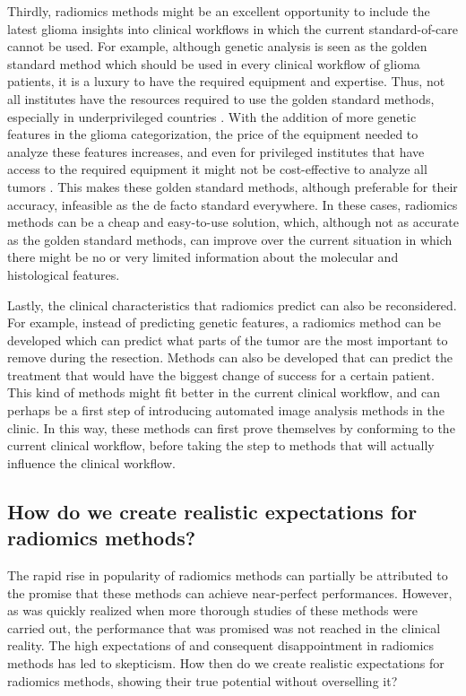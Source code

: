 Thirdly, radiomics methods might be an excellent opportunity to include  the latest glioma insights into clinical workflows in which the current standard-of-care cannot be used.
For example, although genetic analysis is seen as the golden standard method which should be used in every clinical workflow of glioma patients, it is a luxury to have the required equipment and expertise.
Thus, not all institutes have the resources required to use the golden standard methods, especially in underprivileged countries \autocite{santosh2019india}.
With the addition of more genetic features in the glioma categorization, the price of the equipment needed to analyze these features  increases, and even for privileged institutes that have access to the required equipment it might not be cost-effective to analyze all \glspl{tumor} \autocite{malzkorn2016practical,dewitt2017costIDH}.
This makes these golden standard methods, although preferable for their accuracy, infeasible as the de facto standard everywhere.
In these cases, radiomics methods can be a cheap and easy-to-use solution, which, although not as accurate as the golden standard methods, can improve over the current situation in which there might be no or very limited information about the molecular and histological features.

Lastly, the clinical characteristics that radiomics predict can also be reconsidered.
For example, instead of predicting genetic features, a radiomics method can be developed which can predict what parts of the \gls{tumor} are the most important to remove during the resection.
Methods can also be developed that can predict the treatment that would have the biggest change of success for a certain patient.
This kind of methods might fit better in the current clinical workflow, and can perhaps be a first step of introducing automated image analysis methods in the clinic.
In this way, these methods can first prove themselves by conforming to the current clinical workflow, before taking the step to methods that will actually influence the clinical workflow.

\subsection{How do we create realistic expectations for radiomics methods?}

The rapid rise in popularity of radiomics methods can partially be attributed to the promise that these methods can achieve near-perfect performances.
However, as was quickly realized when more thorough studies of these methods were carried out, the performance that was promised was not reached in the clinical reality.
The high expectations of and consequent disappointment in  radiomics methods has led to skepticism.
How then do we create realistic expectations for radiomics methods, showing their true potential without overselling it?

